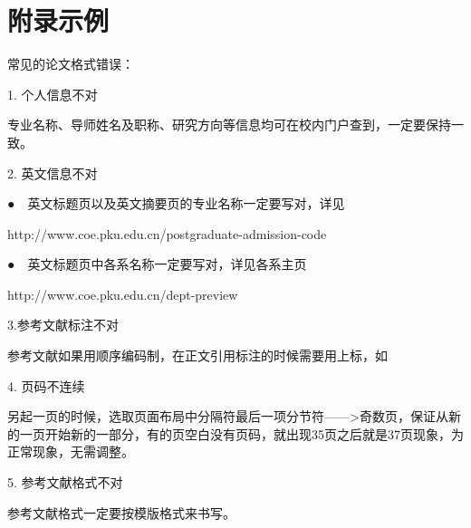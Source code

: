 \chapter{附录示例}
\label{appendix:first}
常见的论文格式错误：

1. 个人信息不对

专业名称、导师姓名及职称、研究方向等信息均可在校内门户查到，一定要保持一致。

2. 英文信息不对

●　英文标题页以及英文摘要页的专业名称一定要写对，详见

http://www.coe.pku.edu.cn/postgraduate-admission-code 

●　英文标题页中各系名称一定要写对，详见各系主页

http://www.coe.pku.edu.cn/dept-preview 

3.参考文献标注不对

参考文献如果用顺序编码制，在正文引用标注\cite{Reference_authors_Chinese,Reference_translated_Chinese}的时候需要用上标，如

4. 页码不连续

另起一页的时候，选取页面布局中分隔符最后一项分节符——>奇数页，保证从新的一页开始新的一部分，有的页空白没有页码，就出现35页之后就是37页现象，为正常现象，无需调整。

5. 参考文献格式不对

参考文献格式一定要按模版格式来书写。

